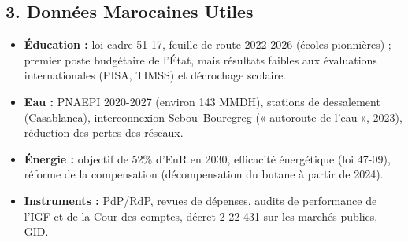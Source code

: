 \subsection*{3. Données Marocaines Utiles}
\begin{itemize}
    \item \textbf{Éducation :} loi-cadre 51-17, feuille de route 2022-2026 (écoles pionnières) ; premier poste budgétaire de l'État, mais résultats faibles aux évaluations internationales (PISA, TIMSS) et décrochage scolaire.
    \item \textbf{Eau :} PNAEPI 2020-2027 (environ 143 MMDH), stations de dessalement (Casablanca), interconnexion Sebou--Bouregreg (« autoroute de l'eau », 2023), réduction des pertes des réseaux.
    \item \textbf{Énergie :} objectif de 52\% d'EnR en 2030, efficacité énergétique (loi 47-09), réforme de la compensation (décompensation du butane à partir de 2024).
    \item \textbf{Instruments :} PdP/RdP, revues de dépenses, audits de performance de l'IGF et de la Cour des comptes, décret 2-22-431 sur les marchés publics, GID.
\end{itemize}

